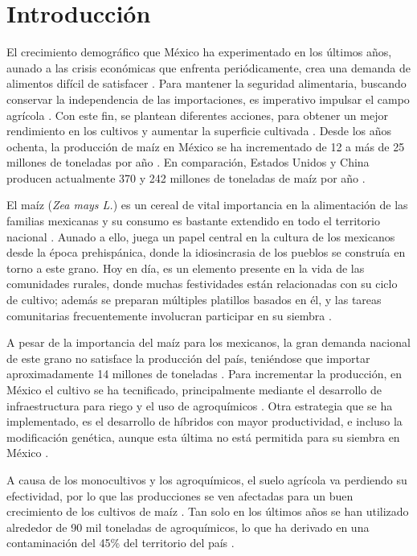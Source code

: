 \documentclass[12pt,letterpaper,oneside]{report}
\begin{document}
\chapter*{Introducción}
El crecimiento demográfico que México ha experimentado en los últimos años, aunado a las crisis económicas que enfrenta periódicamente, crea una demanda de alimentos difícil de satisfacer \autocite{Davis2016,Ibarrola-Rivas2017}. Para mantener la seguridad alimentaria, buscando conservar la independencia de las importaciones, es imperativo impulsar el campo agrícola \autocite{Gil-Mendez2015}. Con este fin, se plantean diferentes acciones, para obtener un mejor rendimiento en los cultivos y aumentar la superficie cultivada \autocite{Edgerton2009}. Desde los años ochenta, la producción de maíz en México se ha incrementado de 12 a más de 25 millones de toneladas por año \autocite{Sweeney2013}. En comparación, Estados Unidos y China producen actualmente 370 y 242 millones de toneladas de maíz por año \autocite{USDA2018}.
\par
El maíz (\textit{Zea mays L.}) es un cereal de vital importancia en la alimentación de las familias mexicanas y su consumo es bastante extendido en todo el territorio nacional \autocite{Morejon-Pereda2017}. Aunado a ello, juega un papel central en la cultura de los mexicanos desde la época prehispánica, donde la idiosincrasia de los pueblos se construía en torno a este grano. Hoy en día, es un elemento presente en la vida de las comunidades rurales, donde muchas festividades están relacionadas con su ciclo de cultivo; además se preparan múltiples platillos basados en él, y las tareas comunitarias frecuentemente involucran participar en su siembra \autocite{Barkin2002}.
\par 
A pesar de la importancia del maíz para los mexicanos, la gran demanda nacional de este grano no satisface la producción del país, teniéndose que importar aproximadamente 14 millones de toneladas \autocite{SAGARPA2017}. Para incrementar la producción, en México el cultivo se ha tecnificado, principalmente mediante el desarrollo de infraestructura para riego y el uso de agroquímicos \autocite{Sweeney2013}. Otra estrategia que se ha implementado, es el desarrollo de híbridos con mayor productividad, e incluso la modificación genética, aunque esta última no está permitida para su siembra en México \autocite{Crow1998,Rani2017,Wang2017,Mastrodomenico2018}. 
\par
A causa de los monocultivos y los agroquímicos, el suelo agrícola va perdiendo su efectividad, por lo que las producciones se ven afectadas para un buen crecimiento de los cultivos de maíz \autocite{Sithole2017}. Tan solo en los últimos años se han utilizado alrededor de 90 mil toneladas de agroquímicos, lo que ha derivado en una contaminación del 45\% del territorio del país \autocite{Bocco2005,Ortiz2013}.
\end{document}
